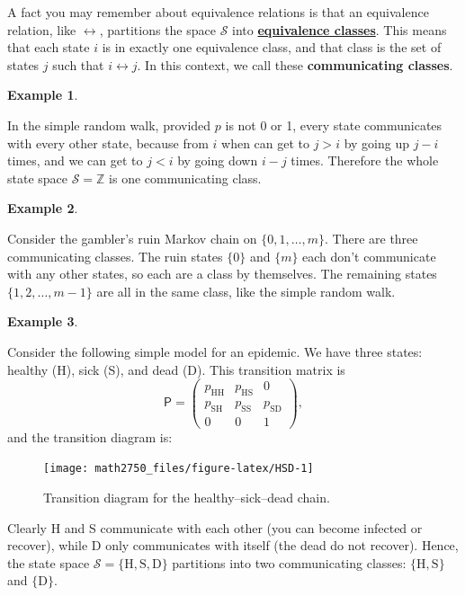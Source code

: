 \documentclass[
  a4paper,
]{article}
\theoremstyle{definition}
\theoremstyle{definition}
\newtheorem{example}{Example}[section]
\theoremstyle{definition}
\theoremstyle{remark}
\begin{document}
A fact you may remember about equivalence relations is that an equivalence relation, like \(\leftrightarrow\), partitions the space \(\mathcal S\) into \href{https://en.wikipedia.org/wiki/Equivalence_class}{\textbf{equivalence classes}}. This means that each state \(i\) is in exactly one equivalence class, and that class is the set of states \(j\) such that \(i \leftrightarrow j\). In this context, we call these \textbf{communicating classes}.

\begin{example}
\protect\hypertarget{exm:rw-class}{}\label{exm:rw-class}

In the simple random walk, provided \(p\) is not 0 or 1, every state communicates with every other state, because from \(i\) when can get to \(j > i\) by going up \(j - i\) times, and we can get to \(j < i\) by going down \(i - j\) times. Therefore the whole state space \(\mathcal S = \mathbb Z\) is one communicating class.

\end{example}

\begin{example}
\protect\hypertarget{exm:gamblers-class}{}\label{exm:gamblers-class}

Consider the gambler's ruin Markov chain on \(\{0,1,\dots,m\}\). There are three communicating classes. The ruin states \(\{0\}\) and \(\{m\}\) each don't communicate with any other states, so each are a class by themselves. The remaining states \(\{1,2,\dots,m-1\}\) are all in the same class, like the simple random walk.

\end{example}

\begin{example}
\protect\hypertarget{exm:hsd-class}{}\label{exm:hsd-class}

Consider the following simple model for an epidemic. We have three states: healthy (H), sick (S), and dead (D). This transition matrix is
\[ \mathsf P = \begin{pmatrix} p_{\mathrm{HH}} & p_{\mathrm{HS}} & 0 \\
p_{\mathrm{SH}} & p_{\mathrm{SS}} & p_{\mathrm{SD}} \\ 0 & 0 & 1 \end{pmatrix} ,    \]
and the transition diagram is:

\begin{figure}

{\centering \texttt{[image: math2750\_files/figure-latex/HSD-1]} 

}

\caption{Transition diagram for the healthy--sick--dead chain.}\label{fig:HSD}
\end{figure}

Clearly H and S communicate with each other (you can become infected or recover), while D only communicates with itself (the dead do not recover). Hence, the state space \(\mathcal S = \{\mathrm{H},\mathrm{S},\mathrm{D}\}\) partitions into two communicating classes: \(\{\mathrm{H},\mathrm{S}\}\) and \(\{\mathrm{D}\}\).

\end{example}
\end{document}
